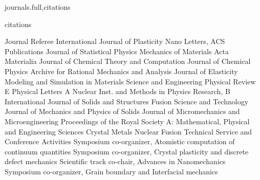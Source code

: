 \documentclass[numbers]{cv}
\begin{document}
\begin{chapters}{journals.full,citations}
  \nocite{admal:tadmor:book:2010}
\end{chapters}

\begin{patents}{citations}
  \nocite{admal:aradhya:1}
\end{patents}

\begin{service}
     \serviceitem
        {Journal Referee}
        {
          \eventitem{} {International Journal of Plasticity } {}
          \eventitem{} {Nano Letters, ACS Publications } {}
          \eventitem{} {Journal of Statistical Physics } {}
          \eventitem{} {Mechanics of Materials } {}
          \eventitem{} {Acta Materialia } {}
          \eventitem{} {Journal of Chemical Theory and Computation } {}
          \eventitem{} {Journal of Chemical Physics } {}
          \eventitem{} {Archive for Rational Mechanics and Analysis } {}
          \eventitem{} {Journal of Elasticity } {}
          \eventitem{} {Modeling and Simulation in Materials Science and Engineering }{}
          \eventitem{} {Physical Review E }{}
          \eventitem{} {Physical Letters A }{}
          \eventitem{} {Nuclear Inst. and Methods in Physics Research, B }{}
          \eventitem{} {International Journal of Solids and Structures } {}
          \eventitem{} {Fusion Science and Technology } {}
          \eventitem{} {Journal of Mechanics and Physics of Solids } {}
          \eventitem{} {Journal of Micromechanics and Microengineering} {}
          \eventitem{} {Proceedings of the Royal Society A: Mathematical, Physical and Engineering Sciences }{}
          \eventitem{} {Crystal } {}
          \eventitem{} {Metals } {}
          \eventitem{} {Nuclear Fusion } {}
       }
    \serviceitem
        {Technical Service and Conference Activities}
        {
             {\hspace{-0.6cm}Symposium co-organizer, Atomistic computation of continuum quantities} {}
             {\hspace{-0.6cm}Symposium co-organizer, Crystal plasticity and discrete defect mechanics} {}
             {\hspace{-0.6cm}Scientific track co-chair, Advances in Nanomechanics}{}
             {\hspace{-0.6cm}Symposium co-organizer, Grain boundary and Interfacial mechanics}{}
}
\end{service}
\end{document}
